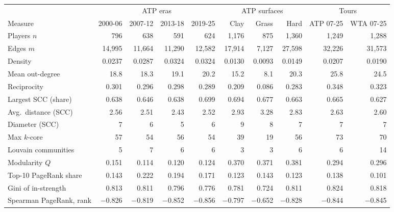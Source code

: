 \begin{tabular}{@{}lrrrrrrrrr@{}}
\toprule
 & \multicolumn{4}{c}{ATP eras} & \multicolumn{3}{c}{ATP surfaces} & \multicolumn{2}{c}{Tours} \\
\cmidrule(lr){2-5}\cmidrule(lr){6-8}\cmidrule(l){9-10}
Measure & 2000-06 & 2007-12 & 2013-18 & 2019-25 & Clay & Grass & Hard & ATP 07-25 & WTA 07-25 \\
\midrule
Players $n$ & 796 & 638 & 591 & 624 & 1,176 & 875 & 1,360 & 1,249 & 1,288 \\
Edges $m$ & 14,995 & 11,664 & 11,290 & 12,582 & 17,914 & 7,127 & 27,598 & 32,226 & 31,573 \\
Density & 0.0237 & 0.0287 & 0.0324 & 0.0324 & 0.0130 & 0.0093 & 0.0149 & 0.0207 & 0.0190 \\
Mean out-degree & 18.8 & 18.3 & 19.1 & 20.2 & 15.2 & 8.1 & 20.3 & 25.8 & 24.5 \\
Reciprocity & 0.301 & 0.296 & 0.298 & 0.289 & 0.209 & 0.086 & 0.283 & 0.348 & 0.323 \\
Largest SCC (share) & 0.638 & 0.646 & 0.638 & 0.699 & 0.694 & 0.677 & 0.663 & 0.665 & 0.627 \\
Avg.\ distance (SCC) & 2.56 & 2.51 & 2.43 & 2.52 & 2.93 & 3.28 & 2.83 & 2.63 & 2.60 \\
Diameter (SCC) & 7 & 6 & 5 & 6 & 9 & 8 & 7 & 7 & 7 \\
Max $k$-core & 57 & 54 & 56 & 54 & 39 & 19 & 56 & 73 & 70 \\
Louvain communities & 5 & 7 & 6 & 6 & 3 & 3 & 6 & 6 & 14 \\
Modularity $Q$ & 0.151 & 0.114 & 0.120 & 0.124 & 0.370 & 0.371 & 0.381 & 0.294 & 0.296 \\
Top-10 PageRank share & 0.143 & 0.222 & 0.194 & 0.171 & 0.123 & 0.143 & 0.123 & 0.138 & 0.101 \\
Gini of in-strength & 0.813 & 0.811 & 0.796 & 0.776 & 0.781 & 0.724 & 0.811 & 0.824 & 0.818 \\
Spearman PageRank, rank & $-$0.826 & $-$0.819 & $-$0.852 & $-$0.856 & $-$0.797 & $-$0.652 & $-$0.828 & $-$0.844 & $-$0.845 \\
\bottomrule
\end{tabular}
